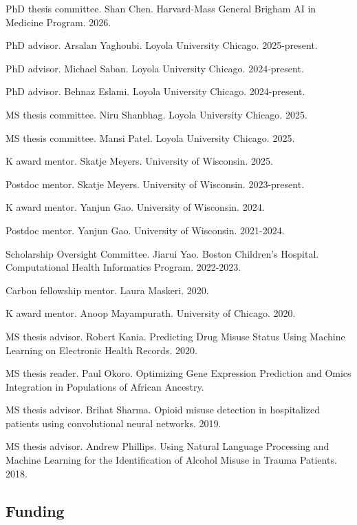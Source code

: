 \documentclass[letterpaper]{article}
\renewenvironment{itemize}{
  \begin{list}{}{
    \setlength{\leftmargin}{1.5em}
  }
}{
  \end{list}
}
\begin{document}
\begin{itemize}
\item PhD thesis committee. Shan Chen. Harvard-Mass General Brigham AI in Medicine Program. 2026.
\item PhD advisor. Arsalan Yaghoubi. Loyola University Chicago. 2025-present.
\item PhD advisor. Michael Saban. Loyola University Chicago. 2024-present.
\item PhD advisor. Behnaz Eslami. Loyola University Chicago. 2024-present.
\item MS thesis committee. Niru Shanbhag. Loyola University Chicago. 2025.
\item MS thesis committee. Mansi Patel. Loyola University Chicago. 2025.
\item K award mentor. Skatje Meyers. University of Wisconsin. 2025.
\item Postdoc mentor. Skatje Meyers. University of Wisconsin. 2023-present.
\item K award mentor. Yanjun Gao. University of Wisconsin. 2024.
\item Postdoc mentor. Yanjun Gao. University of Wisconsin. 2021-2024.
\item Scholarship Oversight Committee. Jiarui Yao. Boston Children's Hospital. Computational Health Informatics Program. 2022-2023.
\item Carbon fellowship mentor. Laura Maskeri. 2020.
\item K award mentor. Anoop Mayampurath. University of Chicago. 2020.
\item MS thesis advisor. Robert Kania. Predicting Drug Misuse Status Using Machine Learning on Electronic Health Records. 2020.
\item MS thesis reader. Paul Okoro. Optimizing Gene Expression Prediction and Omics Integration in Populations of African Ancestry.
\item MS thesis advisor. Brihat Sharma. Opioid misuse detection in hospitalized patients using convolutional neural networks. 2019.
\item MS thesis advisor. Andrew Phillips. Using Natural Language Processing and Machine Learning for the Identification of Alcohol Misuse in Trauma Patients. 2018.
\end{itemize}

\subsection*{Funding}
\end{document}
